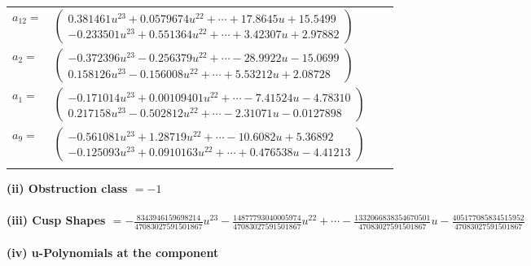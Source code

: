 \documentclass[1p]{elsarticle_modified}
\theoremstyle{definition}
\begin{document}
\begin{tabular}{m{7pt} m{180pt} m{7pt} m{180pt} }
\flushright $a_{12}=$&$\begin{pmatrix}0.381461 u^{23}+0.0579674 u^{22}+\cdots+17.8645 u+15.5499\\-0.233501 u^{23}+0.551364 u^{22}+\cdots+3.42307 u+2.97882\end{pmatrix}$ \\
\flushright $a_{2}=$&$\begin{pmatrix}-0.372396 u^{23}-0.256379 u^{22}+\cdots-28.9922 u-15.0699\\0.158126 u^{23}-0.156008 u^{22}+\cdots+5.53212 u+2.08728\end{pmatrix}$ \\
\flushright $a_{1}=$&$\begin{pmatrix}-0.171014 u^{23}+0.00109401 u^{22}+\cdots-7.41524 u-4.78310\\0.217158 u^{23}-0.502812 u^{22}+\cdots-2.31071 u-0.0127898\end{pmatrix}$ \\
\flushright $a_{9}=$&$\begin{pmatrix}-0.561081 u^{23}+1.28719 u^{22}+\cdots-10.6082 u+5.36892\\-0.125093 u^{23}+0.0910163 u^{22}+\cdots+0.476538 u-4.41213\end{pmatrix}$\\&\end{tabular}
\flushleft \textbf{(ii) Obstruction class $= -1$}\\~\\
\flushleft \textbf{(iii) Cusp Shapes $= -\frac{8343946159698214}{47083027591501867} u^{23}-\frac{14877793040005974}{47083027591501867} u^{22}+\cdots-\frac{1332066838354670501}{47083027591501867} u-\frac{405177085834515952}{47083027591501867}$}\\~\\
\newpage\renewcommand{\arraystretch}{1}
\flushleft \textbf{(iv) u-Polynomials at the component}\newline \\
\end{document}
